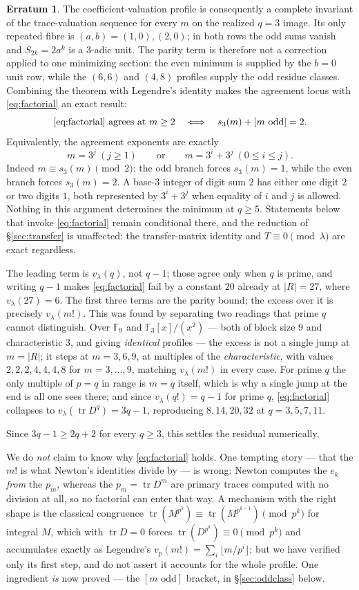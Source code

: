\documentclass[11pt]{article}
\theoremstyle{plain}
\theoremstyle{definition}
\newtheorem{erratum}[theorem]{Erratum}
\newcommand{\FF}{\mathbb F}
\newcommand{\tr}{\operatorname{tr}}
\newcommand{\vlam}{v_\lambda}
\begin{document}
\begin{erratum}
\noindent The coefficient-valuation profile is consequently a complete
invariant of the trace-valuation sequence for every $m$ on the realized
$q=3$ image. Its only repeated fibre is $(a,b)=(1,0),(2,0)$; in both rows the
odd sums vanish and $S_{2k}=2a^k$ is a $3$-adic unit. The parity term is
therefore not a correction applied to one minimizing section: the even
minimum is supplied by the $b=0$ unit row, while the $(6,6)$ and $(4,8)$
profiles supply the odd residue classes. Combining the theorem with Legendre's
identity makes the agreement locus with \eqref{eq:factorial} an exact result:
\[
 \eqref{eq:factorial}\text{ agrees at }m\ge2
 \quad\Longleftrightarrow\quad s_3(m)+[m\text{ odd}]=2.
\]
Equivalently, the agreement exponents are exactly
\[
 m=3^j\ (j\ge1)
 \qquad\text{or}\qquad
 m=3^i+3^j\ (0\le i\le j).
\]
Indeed $m\equiv s_3(m)\pmod2$: the odd branch forces $s_3(m)=1$, while the
even branch forces $s_3(m)=2$. A base-$3$ integer of digit sum $2$ has either
one digit $2$ or two digits $1$, both represented by $3^i+3^j$ when equality
of $i$ and $j$ is allowed.
Nothing in this argument determines the minimum at $q\ge5$. Statements below
that invoke \eqref{eq:factorial} remain conditional there, and the reduction of
\S\ref{sec:transfer} is unaffected: the transfer-matrix identity and
$T\equiv0\pmod\lambda$ are exact regardless.
\end{erratum}

\noindent The leading term is $\vlam(q)$, not $q-1$; those agree only when $q$ is prime,
and writing $q-1$ makes \eqref{eq:factorial} fail by a constant $20$ already at
$|R|=27$, where $\vlam(27)=6$.
The first three terms are the parity bound; the excess over it is precisely
$\vlam(m!)$. This was found by separating two readings that prime $q$ cannot
distinguish. Over $\FF_9$ and $\FF_3[x]/(x^2)$ --- both of block size $9$ and
characteristic $3$, and giving \emph{identical} profiles --- the excess is not
a single jump at $m=|R|$; it steps at $m=3,6,9$, at multiples of the
\emph{characteristic}, with values $2,2,2,4,4,4,8$ for $m=3,\dots,9$, matching
$\vlam(m!)$ in every case. For prime $q$ the only multiple of $p=q$ in range is
$m=q$ itself, which is why a single jump at the end is all one sees there; and
since $\vlam(q!)=q-1$ for prime $q$, \eqref{eq:factorial} collapses to
$\vlam(\tr D^q)=3q-1$, reproducing $8,14,20,32$ at $q=3,5,7,11$.

Since $3q-1\ge2q+2$ for every $q\ge3$, this settles the residual numerically.

We do \emph{not} claim to know why \eqref{eq:factorial} holds. One tempting
story --- that the $m!$ is what Newton's identities divide by --- is wrong:
Newton computes the $e_k$ \emph{from} the $p_m$, whereas the $p_m=\tr D^m$ are
primary traces computed with no division at all, so no factorial can enter that
way. A mechanism with the right shape is the classical congruence
$\tr(M^{p^k})\equiv\tr(M^{p^{k-1}})\pmod{p^k}$ for integral $M$, which with
$\tr D=0$ forces $\tr(D^{p^k})\equiv0 \pmod{p^k}$ and accumulates exactly as
Legendre's $v_p(m!)=\sum_i\lfloor m/p^i\rfloor$; but we have verified only its
first step, and do not assert it accounts for the whole profile. One ingredient
\emph{is} now proved --- the $[m\text{ odd}]$ bracket, in
\S\ref{sec:oddclass} below.
\end{document}
